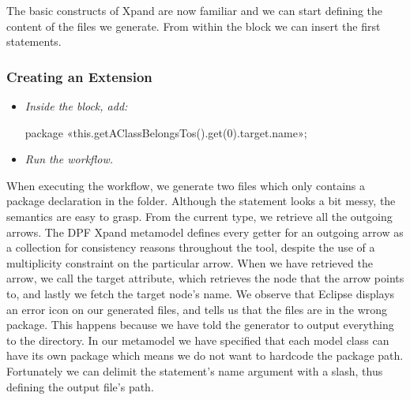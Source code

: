 The basic constructs of Xpand are now familiar and we can start defining the content of the files we generate. From within the  block we can insert the first statements.

\subsubsection{Creating an Extension}
\begin{itemize}
  \item \emph{Inside the  block, add:}
  \begin{plainlisting}
package «this.getAClassBelongsTos().get(0).target.name»;
  \end{plainlisting}
  \item \emph{Run the workflow.}
\end{itemize}
When executing the workflow, we generate two files which only contains a package declaration in the  folder. Although the statement looks a bit messy, the semantics are easy to grasp. From the current  type, we retrieve all the outgoing  arrows. The DPF Xpand metamodel defines every getter for an outgoing arrow as a collection for consistency reasons throughout the tool, despite the use of a \codeText{[1..1]} multiplicity constraint on the particular arrow. When we have retrieved the arrow, we call the target attribute, which retrieves the node that the arrow points to, and lastly we fetch the target node's name. We observe that Eclipse displays an error icon on our generated files, and tells us that the files are in the wrong package. This happens because we have told the generator to output everything to the  directory. In our metamodel we have specified that each model class can have its own package which means we do not want to hardcode the package path. Fortunately we can delimit the  statement's name argument with a slash, thus defining the output file's path.

